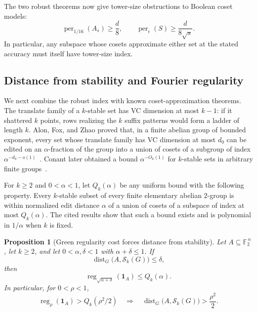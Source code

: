 \documentclass[11pt]{article}
\theoremstyle{plain}
\newtheorem{proposition}[theorem]{Proposition}
\theoremstyle{definition}
\numberwithin{theorem}{section}
\newcommand{\F}{\mathbb{F}}
\newcommand{\reg}{\operatorname{reg}}
\newcommand{\Stable}{\mathcal{S}}
\newcommand{\peridx}{\operatorname{per}}
\begin{document}
The two robust theorems now give tower-size obstructions to Boolean coset
models:
\begin{equation}\label{eq:periodic-applications}
  \peridx_{1/16}(A_s)\ge\frac d8,
  \qquad
  \peridx_\epsilon(S)\ge\frac{d}{8\sqrt{s}}.
\end{equation}
In particular, any subspace whose cosets approximate either set at the
stated accuracy must itself have tower-size index.

\subsection{Distance from stability and Fourier regularity}

We next combine the robust index with known coset-approximation theorems.
The translate family of a $k$-stable set has VC dimension at most $k-1$:
if it shattered $k$ points, rows realizing the $k$ suffix patterns would
form a ladder of length $k$.  Alon, Fox, and Zhao proved that, in a finite
abelian group of bounded exponent, every set whose translate family
has VC dimension at most $d_0$ can be edited on an $\alpha$-fraction of the
group into a union of cosets of a subgroup of index
$\alpha^{-d_0-o(1)}$~\cite{AFZ}.  Conant later obtained a bound
$\alpha^{-O_k(1)}$ for $k$-stable sets in arbitrary finite groups~\cite{Conant}.

For $k\ge2$ and $0<\alpha<1$, let $Q_k(\alpha)$ be any uniform bound with
the following property.  Every $k$-stable subset of every finite elementary
abelian $2$-group is within normalized edit distance $\alpha$ of a union of
cosets of a subspace of index at most $Q_k(\alpha)$.  The cited results show
that such a bound exists and is polynomial in $1/\alpha$ when $k$ is fixed.

\begin{proposition}[Green regularity cost forces distance from stability]
\label{prop:regularity-distance}
Let $A\subseteq\F_2^{\,n}$, let $k\ge2$, and let
$0<\alpha,\delta<1$ with $\alpha+\delta\le1$.  If
\[
  \operatorname{dist}_G\bigl(A,\Stable_k(G)\bigr)\le\delta,
\]
then
\[
  \reg_{\sqrt{\alpha+\delta}}(\mathbf1_A)\le Q_k(\alpha).
\]
In particular, for $0<\rho<1$,
\[
  \reg_\rho(\mathbf1_A)>Q_k(\rho^2/2)
  \quad\Longrightarrow\quad
  \operatorname{dist}_G\bigl(A,\Stable_k(G)\bigr)>\frac{\rho^2}{2}.
\]
\end{proposition}
\end{document}
